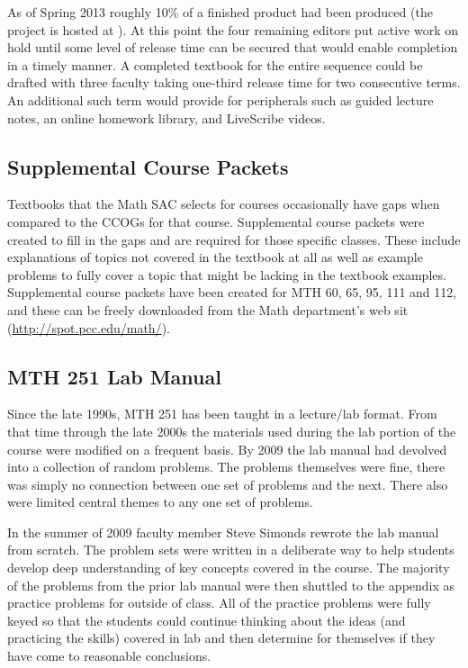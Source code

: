 As of Spring 2013 roughly 10\% of a finished product had been produced (the project is hosted at \cite{mth111project}).  At this point the four remaining editors put active work on hold until some level of release time can be secured that would enable completion in a timely manner.  A completed textbook for the entire sequence could be drafted with three faculty taking one-third release time for two consecutive terms.  An additional such term would provide for peripherals such as guided lecture notes, an online homework library, and LiveScribe videos. 
 
\subsection{Supplemental Course Packets}
Textbooks that the Math SAC selects for courses occasionally have gaps when compared to the CCOGs for that course.  Supplemental course packets were created to fill in the gaps and are required for those specific classes.  These include explanations of topics not covered in the textbook at all as well as example problems to fully cover a topic that might be lacking in the textbook examples.  Supplemental course packets have been created for MTH 60, 65, 95, 111 and 112, and these can be freely downloaded from the Math department's web sit (\href{http://spot.pcc.edu/math/}{http://spot.pcc.edu/math/}).
 
\subsection{MTH 251 Lab Manual}
Since the late 1990s, MTH 251 has been taught in a lecture/lab format.  From that time through the late 2000s the materials used during the lab portion of the course were modified on a frequent basis.  By 2009 the lab manual had devolved into a collection of random problems.  The problems themselves were fine, there was simply no connection between one set of problems and the next.  There also were limited central themes to any one set of problems.

In the summer of 2009 faculty member Steve Simonds rewrote the lab manual from scratch.  The problem sets were written in a deliberate way to help students develop deep understanding of key concepts covered in the course.  The majority of the problems from the prior lab manual were then shuttled to the appendix as practice problems for outside of class.  All of the practice problems were fully keyed so that the students could continue thinking about the ideas (and practicing the skills) covered in lab and then determine for themselves if they have come to reasonable conclusions.

